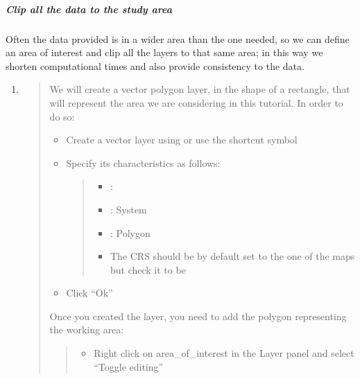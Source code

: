 \documentclass[letterpaper,10pt,english]{sphinxmanual}
\begin{document}
\subparagraph{Clip all the data to the study area}
\label{\detokenize{preparation/preparation:clip-all-the-data-to-the-study-area}}
Often the data provided is in a wider area than the one needed, so we can define an area of interest and clip all the layers to that same area;
in this way we shorten computational times and also provide consistency to the data.
\begin{enumerate}
\def\theenumi{\arabic{enumi}}
\def\labelenumi{\theenumi .}
\makeatletter\def\p@enumii{\p@enumi \theenumi .}\makeatother
\item {} 
\begin{quote}

We will create a vector polygon layer, in the shape of a rectangle, that will represent the area we are considering in this tutorial.
In order to do so:
\begin{itemize}
\item {} 
Create a vector layer using  or use the shortcut symbol 

\item {} 
Specify its characteristics as follows:
\begin{quote}
\begin{itemize}
\item {} 
: 

\item {} 
: System

\item {} 
: Polygon

\item {} 
The CRS should be by default set to the one of the maps but check it to be 

\end{itemize}

\noindent{}
\end{quote}

\item {} 
Click “Ok”

\end{itemize}

Once you created the layer, you need to add the polygon representing the working area:
\begin{quote}
\begin{itemize}
\item {} 
Right click on area\_of\_interest in the Layer panel and select “Toggle editing”


\end{itemize}
\end{quote}
\end{quote}
\end{enumerate}
\end{document}
